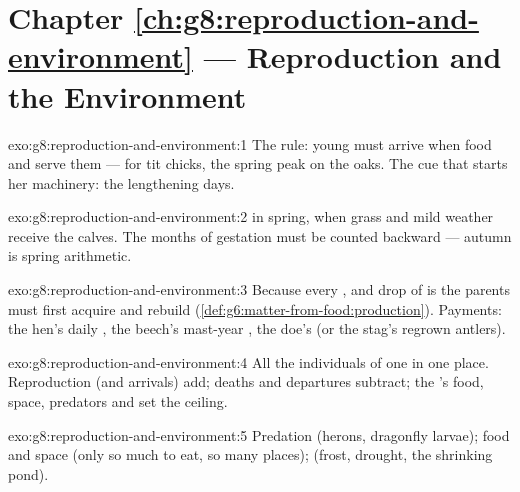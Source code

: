 \section*{Chapter \ref{ch:g8:reproduction-and-environment} --- Reproduction and the Environment}

\begin{solution}{exo:g8:reproduction-and-environment:1}
The rule: young must arrive when food and  serve
them --- for tit chicks, the spring  peak on the
oaks. The cue that starts her machinery: the lengthening
days.
\end{solution}

\begin{solution}{exo:g8:reproduction-and-environment:2}
 in spring, when grass and mild weather receive the
calves. The months of gestation must be counted backward
--- autumn  is spring arithmetic.
\end{solution}

\begin{solution}{exo:g8:reproduction-and-environment:3}
Because every ,  and drop of  is 
the parents must first acquire and rebuild
(\cref{def:g6:matter-from-food:production}). Payments: the
hen's daily , the beech's mast-year  , the
doe's  (or the stag's regrown antlers).
\end{solution}

\begin{solution}{exo:g8:reproduction-and-environment:4}
All the individuals of one  in one place.
Reproduction (and arrivals) add; deaths and departures
subtract; the 's food, space, predators and
 set the ceiling.
\end{solution}

\begin{solution}{exo:g8:reproduction-and-environment:5}
Predation (herons, dragonfly larvae); food and space
(only so much to eat, so many places);  (frost,
drought, the shrinking pond).
\end{solution}

